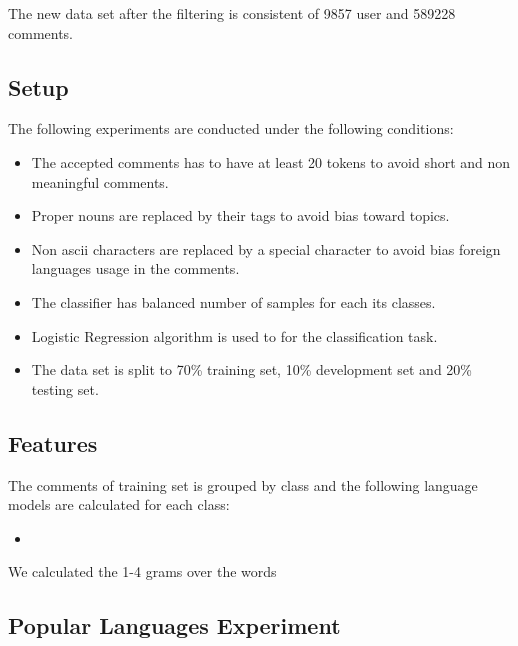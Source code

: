 \documentclass[11pt]{article}
\begin{document}
The new data set after the filtering is consistent of 9857 user and 589228 comments.

\subsection{Setup}
The following experiments are conducted under the following conditions:
\begin{itemize}
\item The accepted comments has to have at least 20 tokens to avoid short and non meaningful comments.
\item Proper nouns are replaced by their tags to avoid bias toward topics.
\item Non ascii characters are replaced by a special character to avoid bias foreign languages usage in the comments.
\item The classifier has balanced number of samples for each its classes.
\item Logistic Regression algorithm is used to for the classification task.
\item The data set is split to 70\% training set, 10\% development set and 20\% testing set.
\end{itemize}

\subsection{Features}
The comments of training set is grouped by class and the following language models are calculated for each class:
\begin{itemize}
\item
\end{itemize}

We calculated the 1-4 grams over the words


\subsection{Popular Languages Experiment}
\end{document}
